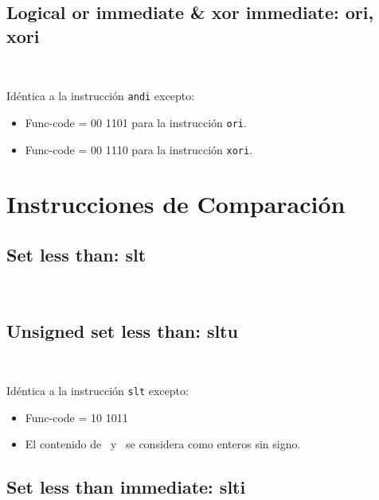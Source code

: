 \documentclass[12pt]{amsart}
\begin{document}
	
	
	\subsection{Logical or immediate \& xor immediate: \textbf{ori, xori}}\ 
	
	Idéntica a la instrucción \texttt{andi} excepto:
	\begin{itemize}
		\item Func-code = 00 1101 para la instrucción \texttt{ori}.
		\item Func-code = 00 1110 para la instrucción \texttt{xori}.
	\end{itemize}

	\section{Instrucciones de Comparación}
	
	\subsection{Set less than: \textbf{slt}}\ 
	
	
	
	\subsection{Unsigned set less than: \textbf{sltu}}\ 
	
	Idéntica a la instrucción \texttt{slt} excepto:
	\begin{itemize}
		\item Func-code = 10 1011
		\item El contenido de \Rs\ y \Rt\ se considera como enteros sin signo.
	\end{itemize}
	
	\subsection{Set less than immediate: \textbf{slti}}\ 
	
\end{document}
